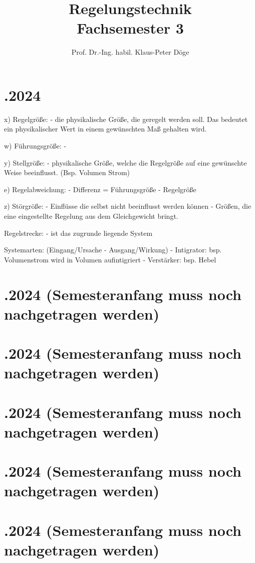 \documentclass[a4paper, twoside, 11pt]{article}
\title{Regelungstechnik  \\ [1ex] \large Fachsemester 3}
\author{Prof. Dr.-Ing. habil. Klaus-Peter Döge}
\date{}
\begin{document}
\maketitle


\newpage
 \section*{.2024}

  x) Regelgröße:
  - die physikalische Größe, die geregelt werden soll. Das bedeutet ein physikalischer Wert in einem gewünschten Maß gehalten wird.

  w) Führungsgröße:
  -

  y) Stellgröße:
  - physikalische Größe, welche die Regelgröße auf eine gewünschte Weise beeinflusst. (Bsp. Volumen Strom)

  e) Regelabweichung:
  - Differenz = Führungsgröße - Regelgröße

  z) Störgröße:
  - Einflüsse die selbst nicht beeinflusst werden können
  - Größen, die eine eingestellte Regelung aus dem Gleichgewicht bringt.

  Regelstrecke:
  - ist das zugrunde liegende System

  Systemarten: (Eingang/Ursache - Ausgang/Wirkung)
  - Intigrator: bsp. Volumenstrom wird in Volumen aufintigriert
  - Verstärker: bsp. Hebel


\newpage
\section*{.2024 (Semesteranfang muss noch nachgetragen werden)}
\section*{.2024 (Semesteranfang muss noch nachgetragen werden)}
\section*{.2024 (Semesteranfang muss noch nachgetragen werden)}
\section*{.2024 (Semesteranfang muss noch nachgetragen werden)}
\section*{.2024 (Semesteranfang muss noch nachgetragen werden)}
\end{document}
